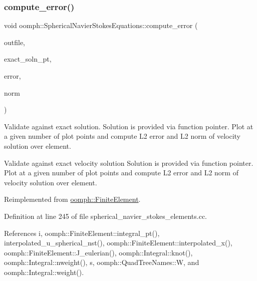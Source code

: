 \mbox{\label{classoomph_1_1SphericalNavierStokesEquations_a8904427521c872ffb9ce8109044ba7ff}} 
\subsubsection{\texorpdfstring{compute\+\_\+error()}{compute\_error()}\hspace{0.1cm}{\footnotesize\ttfamily [2/2]}}
{\footnotesize\ttfamily void oomph\+::\+Spherical\+Navier\+Stokes\+Equations\+::compute\+\_\+error (\begin{DoxyParamCaption}\item[{std\+::ostream \&}]{outfile,  }\item[{\hyperlink{classoomph_1_1FiniteElement_a690fd33af26cc3e84f39bba6d5a85202}{Finite\+Element\+::\+Steady\+Exact\+Solution\+Fct\+Pt}}]{exact\+\_\+soln\+\_\+pt,  }\item[{double \&}]{error,  }\item[{double \&}]{norm }\end{DoxyParamCaption})\hspace{0.3cm}{\ttfamily [virtual]}}



Validate against exact solution. Solution is provided via function pointer. Plot at a given number of plot points and compute L2 error and L2 norm of velocity solution over element. 

Validate against exact velocity solution Solution is provided via function pointer. Plot at a given number of plot points and compute L2 error and L2 norm of velocity solution over element. 

Reimplemented from \hyperlink{classoomph_1_1FiniteElement_a73c79a1f1e5b1d334757812a6bbd58ff}{oomph\+::\+Finite\+Element}.



Definition at line 245 of file spherical\+\_\+navier\+\_\+stokes\+\_\+elements.\+cc.



References i, oomph\+::\+Finite\+Element\+::integral\+\_\+pt(), interpolated\+\_\+u\+\_\+spherical\+\_\+nst(), oomph\+::\+Finite\+Element\+::interpolated\+\_\+x(), oomph\+::\+Finite\+Element\+::\+J\+\_\+eulerian(), oomph\+::\+Integral\+::knot(), oomph\+::\+Integral\+::nweight(), s, oomph\+::\+Quad\+Tree\+Names\+::W, and oomph\+::\+Integral\+::weight().

